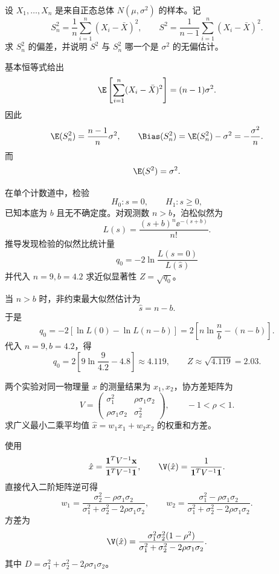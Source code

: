 \begin{question}
设 $X_1,\ldots,X_n$ 是来自正态总体 $N(\mu,\sigma^2)$ 的样本。记
\[
S_n^2=\frac1n\sum_{i=1}^n(X_i-\bar X)^2,
\qquad
S^2=\frac1{n-1}\sum_{i=1}^n(X_i-\bar X)^2.
\]
求 $S_n^2$ 的偏差，并说明 $S^2$ 与 $S_n^2$ 哪一个是 $\sigma^2$ 的无偏估计。
\begin{solution}
基本恒等式给出
\[
\E\left[\sum_{i=1}^n(X_i-\bar X)^2\right]=(n-1)\sigma^2.
\]
因此
\[
\E(S_n^2)=\frac{n-1}{n}\sigma^2,
\qquad
\Bias(S_n^2)=\E(S_n^2)-\sigma^2=-\frac{\sigma^2}{n}.
\]
而
\[
\E(S^2)=\sigma^2.
\]
\end{solution}
\end{question}

\begin{question}
在单个计数道中，检验
\[
H_0:s=0,
\qquad H_1:s\ge0,
\]
已知本底为 $b$ 且无不确定度。对观测数 $n>b$，泊松似然为
\[
L(s)=\frac{(s+b)^n\ee^{-(s+b)}}{n!}.
\]
推导发现检验的似然比统计量
\[
q_0=-2\ln\frac{L(s=0)}{L(\hat s)}
\]
并代入 $n=9,b=4.2$ 求近似显著性 $Z=\sqrt{q_0}$。
\begin{solution}
当 $n>b$ 时，非约束最大似然估计为
\[
\hat s=n-b.
\]
于是
\[
q_0=-2\left[\ln L(0)-\ln L(n-b)\right]
=2\left[n\ln\frac n b-(n-b)\right].
\]
代入 $n=9,b=4.2$，得
\[
q_0=2\left[9\ln\frac9{4.2}-4.8\right]\approx4.119,
\qquad
Z\approx\sqrt{4.119}=2.03.
\]
\end{solution}
\end{question}

\begin{question}
两个实验对同一物理量 $x$ 的测量结果为 $x_1,x_2$，协方差矩阵为
\[
V=\begin{pmatrix}
\sigma_1^2&\rho\sigma_1\sigma_2\\
\rho\sigma_1\sigma_2&\sigma_2^2
\end{pmatrix},\qquad -1<\rho<1.
\]
求广义最小二乘平均值 $\hat x=w_1x_1+w_2x_2$ 的权重和方差。
\begin{solution}
使用
\[
\hat x=\frac{\mathbf1^TV^{-1}\mathbf x}{\mathbf1^TV^{-1}\mathbf1},
\qquad
\V(\hat x)=\frac1{\mathbf1^TV^{-1}\mathbf1}.
\]
直接代入二阶矩阵逆可得
\[
w_1=\frac{\sigma_2^2-\rho\sigma_1\sigma_2}
{\sigma_1^2+\sigma_2^2-2\rho\sigma_1\sigma_2},
\qquad
w_2=\frac{\sigma_1^2-\rho\sigma_1\sigma_2}
{\sigma_1^2+\sigma_2^2-2\rho\sigma_1\sigma_2}.
\]
方差为
\[
\V(\hat x)=\frac{\sigma_1^2\sigma_2^2(1-\rho^2)}
{\sigma_1^2+\sigma_2^2-2\rho\sigma_1\sigma_2}.
\]
其中 $D=\sigma_1^2+\sigma_2^2-2\rho\sigma_1\sigma_2$。
\end{solution}
\end{question}

